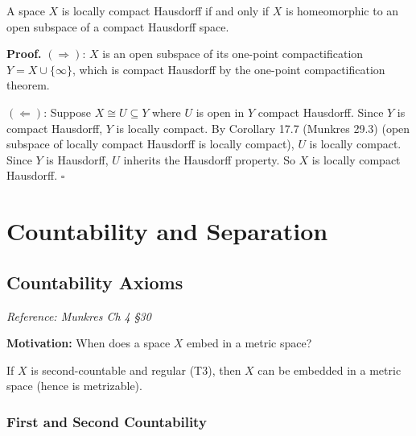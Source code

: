 \documentclass[11pt]{report}
\renewenvironment{proof}[1][Proof]{\noindent\textbf{#1.} }{\hfill$\square$\par\vspace{5pt}}
\begin{document}
\begin{corbox}
A space $X$ is locally compact Hausdorff if and only if $X$ is homeomorphic to an open subspace of a compact Hausdorff space.
\end{corbox}

\begin{proof}
$(\Rightarrow)$: $X$ is an open subspace of its one-point compactification $Y = X \cup \{\infty\}$, which is compact Hausdorff by the one-point compactification theorem.

$(\Leftarrow)$: Suppose $X \cong U \subseteq Y$ where $U$ is open in $Y$ compact Hausdorff. Since $Y$ is compact Hausdorff, $Y$ is locally compact. By Corollary 17.7 (Munkres 29.3) (open subspace of locally compact Hausdorff is locally compact), $U$ is locally compact. Since $Y$ is Hausdorff, $U$ inherits the Hausdorff property. So $X$ is locally compact Hausdorff.
\end{proof}

\chapter{Countability and Separation}

\section{Countability Axioms}

\textit{Reference: Munkres Ch 4 \S 30}

\textbf{Motivation:} When does a space $X$ embed in a metric space?

\begin{thmbox}
If $X$ is second-countable and regular (T3), then $X$ can be embedded in a metric space (hence is metrizable).
\end{thmbox}

\subsection{First and Second Countability}
\end{document}

